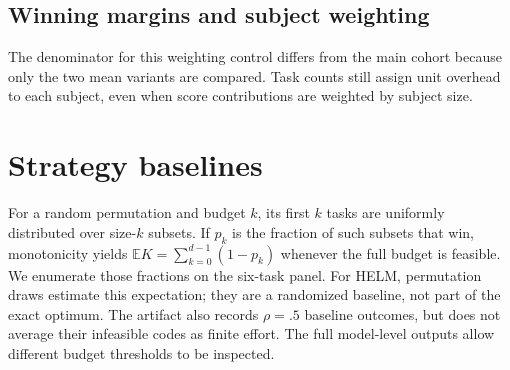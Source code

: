 \documentclass{article}
\newcommand{\eps}{\varepsilon}
\begin{document}
\subsection{Winning margins and subject weighting}
\begin{table}[h]
\centering\small\setlength{\tabcolsep}{3pt}

\caption{Positive-margin control ($\eps=10^{-6}$), $\rho=1$.
``Any $K$ changed'' counts targets whose support budget changes for at least
one of the four rules relative to co-first. All remain feasible.}
\label{tab:ties}
\end{table}

\begin{table}[h]
\centering\small

\caption{HELM arithmetic mean with equal subject weights (macro) versus weights
proportional to evaluated question counts (micro). Cohort: entries not initially
co-first under either mean, rather than the four-rule cohort of the main audit.}
\label{tab:weighting}
\end{table}
The denominator for this weighting control differs from the main cohort because
only the two mean variants are compared. Task counts still assign unit overhead
to each subject, even when score contributions are weighted by subject size.

\section{Strategy baselines}
\label{app:baselines}
\begin{table}[h]
\centering\small

\caption{Mean number of tasks before reaching co-first, $\rho=1$.
Lowest-first orders by original task scores. Random-order expectation is exact
over subsets on Open LLM and estimated using 256 independent random permutations
per target on HELM (seed 20261102); $\pm$ gives one Monte Carlo standard error
of the finite-cohort mean, propagating independent target-wise draw variances.
The optimal and lowest-first entries coincide
at unit ceilings as a theorem, not a numerical coincidence.}
\label{tab:baselines}
\end{table}
For a random permutation and budget $k$, its first $k$ tasks are uniformly
distributed over size-$k$ subsets. If $p_k$ is the fraction of such subsets that
win, monotonicity yields $\mathbb{E}K=\sum_{k=0}^{d-1}(1-p_k)$ whenever the full
budget is feasible. We enumerate those fractions on the six-task panel. For
HELM, permutation draws estimate this expectation; they are a randomized
baseline, not part of the exact optimum. The artifact also records $\rho=.5$
baseline outcomes, but does not average their infeasible codes as finite effort.
The full model-level outputs allow different budget thresholds to be inspected.
\end{document}
